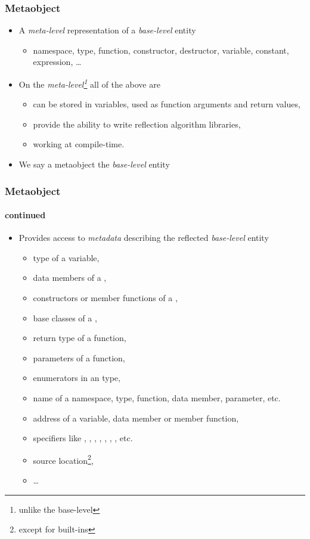 \documentclass[compress,table,xcolor=table]{beamer}
\begin{document}
\begin{frame}
  \frametitle{Metaobject}
  \larger
  \begin{itemize}
    \item A {\em meta-level} representation of a {\em base-level} entity
      \begin{itemize}
      \smaller
        \item namespace, type, function, constructor, destructor, variable,
          constant, expression, \ldots
      \end{itemize}
    \item On the {\em meta-level\footnote{unlike the base-level}} all
      of the above are 
      \begin{itemize}
      \smaller
        \item can be stored in variables, used as function arguments and
          return values,
        \item provide the ability to write reflection algorithm libraries,
        \item working at compile-time.
      \end{itemize}
    \item We say a metaobject  the {\em base-level} entity
  \end{itemize}
\end{frame}
\begin{frame}
  \frametitle{Metaobject}
  \framesubtitle{continued}
  \larger
  \begin{itemize}
    \item Provides access to {\em metadata} describing the reflected
      {\em base-level} entity
      \begin{itemize}
      \smaller
        \item type of a variable,
        \item data members of a ,
        \item constructors or member functions of a ,
        \item base classes of a ,
        \item return type of a function,
        \item parameters of a function,
        \item enumerators in an  type,
        \item name of a namespace, type, function, data member, parameter, etc.
        \item address of a variable, data member or member function,
        \item specifiers like , ,
          , , ,
          , , etc.
        \item source location\footnote{except for built-ins},
        \item \ldots
      \end{itemize}
  \end{itemize}
\end{frame}
\end{document}
